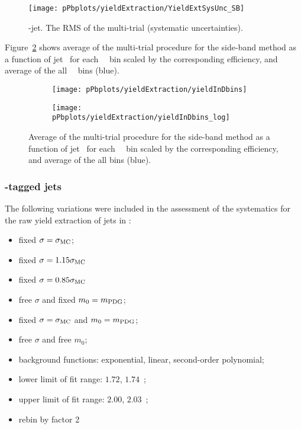 \begin{figure}[bth]
\begin{center}
\texttt{[image: pPbplots/yieldExtraction/YieldExtSysUnc\_SB]}
\caption{\Dstar-jet. The RMS of the multi-trial (systematic uncertainties).} 
\label{fig:MultiTrialRMS_pPB}
\end{center}
\end{figure}

Figure~\ref{fig:MultiTrialSB_trials_pPB} shows average of the multi-trial procedure for the side-band method as a function of jet \pt\ for each \Dstar\ \pt\ bin scaled by the corresponding efficiency, and average of the all \Dstar\ \pt\ bins (blue). 

\begin{figure}[bth]
\begin{center}
\begin{subfigure}[b]{.45\textwidth}
\texttt{[image: pPbplots/yieldExtraction/yieldInDbins]}
\end{subfigure}
\begin{subfigure}[b]{.45\textwidth}
\texttt{[image: pPbplots/yieldExtraction/yieldInDbins\_log]}
\end{subfigure}
\caption{Average of the multi-trial procedure for the side-band method as a function of jet \pt\ for each \Dstar\ \pt\ bin scaled by the corresponding efficiency, and average of the all \Dstar \pt bins (blue).} 
\label{fig:MultiTrialSB_trials_pPB}
\end{center}
\end{figure}

\subsubsection{\Dzero-tagged jets}

The following variations were included in the assessment of the systematics for the raw yield extraction of \Dzero jets in \pPb:
\begin{itemize}
\item fixed $\sigma=\sigma_{\rm MC}$;
\item fixed $\sigma=1.15\sigma_{\rm MC}$
\item fixed $\sigma=0.85\sigma_{\rm MC}$
\item free $\sigma$ and fixed $m_{0}=m_{\rm PDG}$;
\item fixed $\sigma=\sigma_{\rm MC}$ and $m_{0}=m_{\rm PDG}$;
\item free $\sigma$ and free $m_{0}$;
\item background functions: exponential, linear, second-order polynomial;
\item lower limit of fit range: $1.72$, $1.74$~\GeVcsq;
\item upper limit of fit range: $2.00$, $2.03$~\GeVcsq;
\item rebin by factor 2
\end{itemize}


